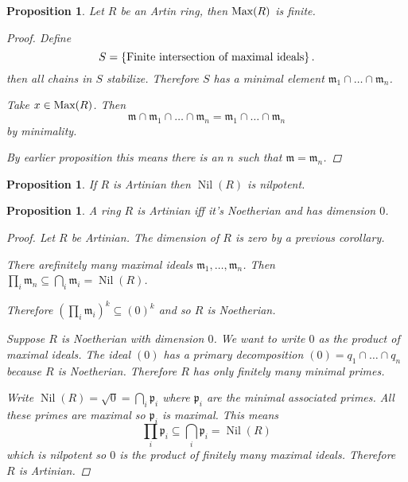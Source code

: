 \documentclass{article}
\newcommand{\set}[1]{\left\{#1\right\}}
\DeclareMathOperator{\Nil}{Nil}
\newcommand{\maxid}{\mathfrak{m}}
\newcommand{\primeid}{\mathfrak{p}}
\newtheorem{proposition}[theorem]{Proposition}
\theoremstyle{definition}
\begin{document}
\begin{proposition}
    Let \(R\) be an Artin ring, then \(\textnormal{Max}(R)\) is finite.

    \begin{proof}
        Define
        \[
            S=\set{\textnormal{Finite intersection of maximal ideals}}.
        \]
        then all chains in \(S\) stabilize. Therefore \(S\) has a minimal
        element \(\maxid_{1}\cap\ldots\cap\maxid_{n}\).

        Take \(x\in\textnormal{Max}(R)\). Then
        \[
            \maxid\cap\maxid_{1}\cap\ldots\cap\maxid_{n}=\maxid_{1}\cap\ldots\cap\maxid_{n}
        \]
        by minimality.

        By earlier proposition this means there is an \(n\) such that
        \(\maxid=\maxid_{n}\).
    \end{proof}
\end{proposition}

\begin{proposition}
    If \(R\) is Artinian then \(\Nil(R)\) is nilpotent.
\end{proposition}

\begin{proposition}
    A ring \(R\) is Artinian iff it's Noetherian and has dimension \(0\).

    \begin{proof}
        Let \(R\) be Artinian. The dimension of \(R\) is zero by a previous
        corollary.

        There arefinitely many maximal ideals \(\maxid_{1},\ldots,\maxid_{n}\).
        Then
        \(\prod_{i}\maxid_{n}\subseteq\bigcap_{i}\maxid_{i}=\Nil(R)\).

        Therefore \((\prod_{i}\maxid_{i})^{k}\subseteq(0)^{k}\) and so \(R\) is
        Noetherian.

        Suppose \(R\) is Noetherian with dimension \(0\). We want to write \(0\)
        as the product of maximal ideals. The ideal \((0)\) has a primary
        decomposition \((0)=q_{1}\cap\ldots\cap q_{n}\) because \(R\) is
        Noetherian. Therefore \(R\) has only finitely many minimal primes.

        Write \(\Nil(R)=\sqrt{0}=\bigcap_{i}\primeid_{i}\) where
        \(\primeid_{i}\) are the minimal associated primes. All these primes are
        maximal so \(\primeid_{i}\) is maximal. This means
        \[
            \prod_{i}\primeid_{i}\subseteq\bigcap_{i}\primeid_{i}=\Nil(R)
        \]
        which is nilpotent so \(0\) is the product of finitely many maximal
        ideals. Therefore \(R\) is Artinian.
    \end{proof}
\end{proposition}
\end{document}
